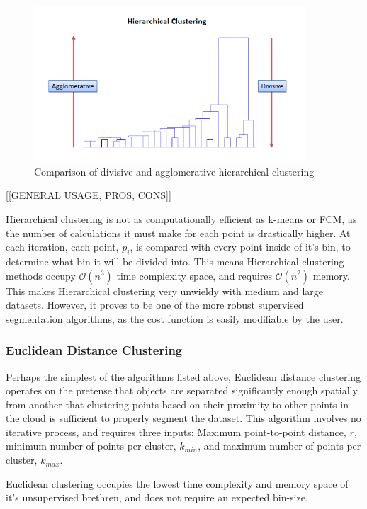 \documentclass[12pt]{drexelthesis}
\let\Oldsubsubsection\subsubsection
\renewcommand{\subsubsection}{\FloatBarrier\Oldsubsubsection}
\begin{document}
\begin{figure}[!ht]
\centering
\includegraphics[width=4in]{divisiveAgglomerative.png}
\caption[Comparison of divisive and agglomerative clustering methods]{Comparison of divisive and agglomerative hierarchical clustering}
\end{figure}

[[GENERAL USAGE, PROS, CONS]]

Hierarchical clustering is not as computationally efficient as k-means or FCM, as the number of calculations it must make for each point is drastically higher. At each iteration, each point, $p_{i}$, is compared with every point inside of it's bin, to determine what bin it will be divided into. This means Hierarchical clustering methods occupy $\mathcal{O}(n^{3})$ time complexity space, and requires $\mathcal{O}(n^{2})$ memory. This makes Hierarchical clustering very unwieldy with medium and large datasets. However, it proves to be one of the more robust supervised segmentation algorithms, as the cost function is easily modifiable by the user.


\subsubsection{Euclidean Distance Clustering}
Perhaps the simplest of the algorithms listed above, Euclidean distance clustering operates on the pretense that objects are separated significantly enough spatially from another that clustering points based on their proximity to other points in the cloud is sufficient to properly segment the dataset. This algorithm involves no iterative process, and requires three inputs: Maximum point-to-point distance, $r$, minimum number of points per cluster, $k_{min}$, and maximum number of points per cluster, $k_{max}$.

Euclidean clustering occupies the lowest time complexity and memory space of it's unsupervised brethren, and does not require an expected bin-size.
\end{document}
